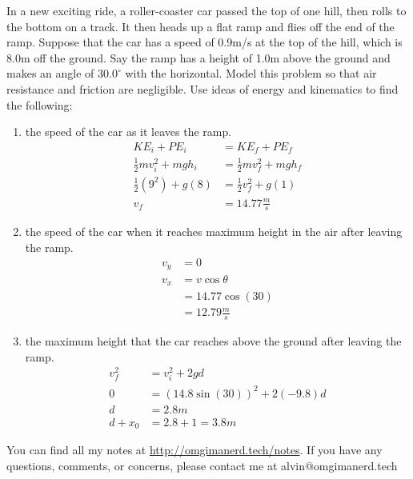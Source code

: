 \documentclass[letterpaper, 12pt]{math}
\begin{document}
In a new exciting ride, a roller-coaster car passed the top of one hill, then
rolls to the bottom on a track. It then heads up a flat ramp and flies off the
end of the ramp. Suppose that the car has a speed of 0.9m/s at the top of the
hill, which is 8.0m off the ground. Say the ramp has a height of 1.0m above the
ground and makes an angle of \( 30.0^{\circ} \) with the horizontal. Model
this problem so that air resistance and friction are negligible. Use ideas of
energy and kinematics to find the following:
\begin{enumerate}
  \item the speed of the car as it leaves the ramp.
  \begin{align*}
    KE_i+PE_i &= KE_f+PE_f \\
    \frac{1}{2}mv_i^2+mgh_i &= \frac{1}{2}mv_f^2+mgh_f \\
    \frac{1}{2}(9^2)+g(8) &= \frac{1}{2}v_f^2+g(1) \\
    v_f &= 14.77\frac{m}{s}
  \end{align*}
  \item the speed of the car when it reaches maximum height in the air after
  leaving the ramp.
  \begin{align*}
    v_y &= 0 \\
    v_x &= v\cos\theta \\
    &= 14.77\cos(30) \\
    &= 12.79\frac{m}{s}
  \end{align*}
  \item the maximum height that the car reaches above the ground after leaving
  the ramp.
  \begin{align*}
    v_f^2 &= v_i^2+2gd \\
    0 &= (14.8\sin(30))^2+2(-9.8)d \\
    d &= 2.8m \\
    d+x_0 &= 2.8+1 = 3.8m
  \end{align*}
\end{enumerate}

\begin{center}
  You can find all my notes at \url{http://omgimanerd.tech/notes}. If you have
  any questions, comments, or concerns, please contact me at
  alvin@omgimanerd.tech
\end{center}
\end{document}
